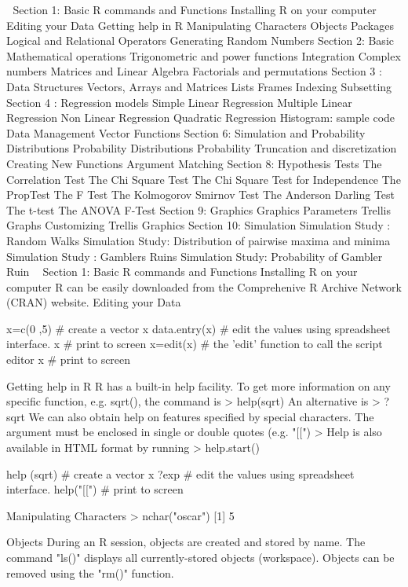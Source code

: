 

Section 1: Basic R commands and Functions
Installing R on your computer
Editing your Data
Getting help in R
Manipulating Characters
Objects
Packages
Logical and Relational Operators
Generating Random Numbers
Section 2: Basic Mathematical operations
Trigonometric and power functions
Integration
Complex numbers
Matrices and Linear Algebra
Factorials and permutations
Section 3 : Data Structures
Vectors, Arrays and Matrices
Lists
Frames
Indexing
Subsetting
Section 4 : Regression models
Simple Linear Regression
Multiple Linear Regression
Non Linear Regression
Quadratic Regression
Histogram: sample code
Data Management
Vector Functions
Section 6: Simulation and Probability Distributions
Probability Distributions
Probability
Truncation and discretization
Creating New Functions
Argument Matching
Section 8: Hypothesis Tests
The Correlation Test
The Chi Square Test
The Chi Square Test for Independence
The PropTest
The F Test
The Kolmogorov Smirnov Test
The Anderson Darling Test
The t-test
The ANOVA F-Test
Section 9: Graphics
Graphics Parameters
Trellis Graphs
Customizing Trellis Graphics
Section 10: Simulation
Simulation Study : Random Walks
Simulation Study: Distribution of pairwise maxima and minima
Simulation Study : Gamblers Ruins
Simulation Study: Probability of Gambler Ruin

Section 1: Basic R commands and Functions
Installing R on your computer
R can be easily downloaded from the Comprehenive R Archive Network (CRAN) website.
Editing your Data

x=c(0 ,5)     	      # create a vector x
data.entry(x)  	   # edit the values using spreadsheet interface.
x  	                     # print to screen
x=edit(x)	          # the 'edit' function to call the script editor
x  	                     # print to screen

Getting help in R
R has a built-in help facility. To get more information on any specific function, e.g. sqrt(), the command is
> help(sqrt)
An alternative is
> ? sqrt
We can also obtain help on features specified by special characters.
The argument must be enclosed in single or double quotes (e.g. "[[")
> 
Help is also available in HTML format by running
> help.start()



help (sqrt)   	      # create a vector x
?exp  	   		  # edit the values using spreadsheet interface.
help("[[")	         # print to screen

Manipulating Characters
> nchar("oscar")
[1] 5

Objects
During an R session, objects are created and stored by name. The command "ls()" displays all currently-stored objects (workspace). Objects can be removed using the "rm()" function.



